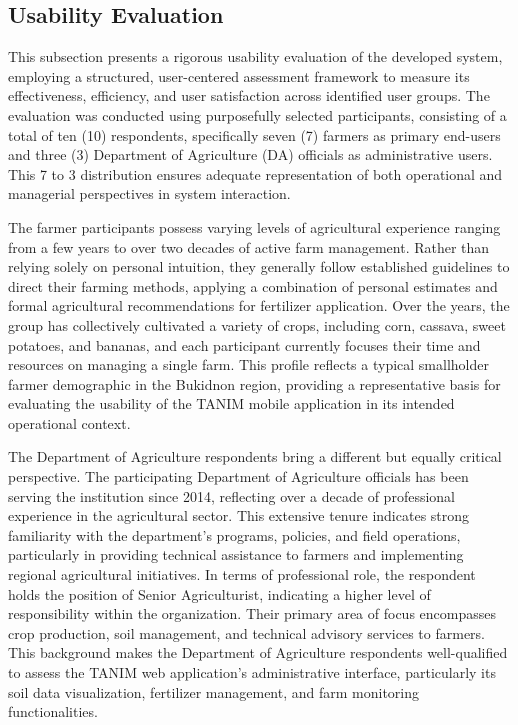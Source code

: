 {	\subsection{Usability Evaluation}
	
	This subsection presents a rigorous usability evaluation of the developed system, employing a structured, user-centered assessment framework to measure its effectiveness, efficiency, and user satisfaction across identified user groups. The evaluation was conducted using purposefully selected participants, consisting of a total of ten (10) respondents, specifically seven (7) farmers as primary end-users and three (3) Department of Agriculture (DA) officials as administrative users. This 7 to 3 distribution ensures adequate representation of both operational and managerial perspectives in system interaction.
	
	The farmer participants possess varying levels of agricultural experience ranging from a few years to over two decades of active farm management. Rather than relying solely on personal intuition, they generally follow established guidelines to direct their farming methods, applying a combination of personal estimates and formal agricultural recommendations for fertilizer application. Over the years, the group has collectively cultivated a variety of crops, including corn, cassava, sweet potatoes, and bananas, and each participant currently focuses their time and resources on managing a single farm. This profile reflects a typical smallholder farmer demographic in the Bukidnon region, providing a representative basis for evaluating the usability of the TANIM mobile application in its intended operational context.
	
	The Department of Agriculture respondents bring a different but equally critical perspective. The participating Department of Agriculture officials has been serving the institution since 2014, reflecting over a decade of professional experience in the agricultural sector. This extensive tenure indicates strong familiarity with the department's programs, policies, and field operations, particularly in providing technical assistance to farmers and implementing regional agricultural initiatives. In terms of professional role, the respondent holds the position of Senior Agriculturist, indicating a higher level of responsibility within the organization. Their primary area of focus encompasses crop production, soil management, and technical advisory services to farmers. This background makes the Department of Agriculture respondents well-qualified to assess the TANIM web application's administrative interface, particularly its soil data visualization, fertilizer management, and farm monitoring functionalities.
	
}
